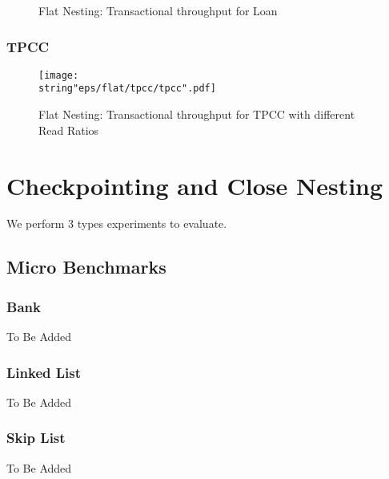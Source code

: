 \documentclass[12pt,english]{report}
\begin{document}
\begin{figure}[H]
\centering
{}
\qquad
{}
\end{figure}

\begin{figure}[H]
\caption{Flat Nesting: Transactional throughput for Loan}
\label{Fig:flatLoan}
\end{figure}

\subsubsection{TPCC}

\begin{figure}[H]
\centering
\texttt{[image: \\string"eps/flat/tpcc/tpcc".pdf]}
\caption{Flat Nesting: Transactional throughput for TPCC with different Read Ratios}
\label{Fig:flatTPCC}
\end{figure}

\section{Checkpointing and Close Nesting}

We perform 3 types experiments to evaluate.

\subsection{Micro Benchmarks}

\subsubsection{Bank}
To Be Added

\subsubsection{Linked List}
To Be Added 

\subsubsection{Skip List}
To Be Added  
\end{document}
